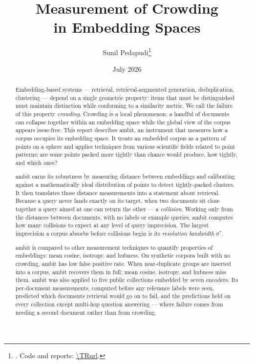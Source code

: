\documentclass[11pt,letterpaper]{article}
\title{\textbf{Measurement of Crowding\\ in Embedding Spaces}}
\author{Sunil Pedapudi\thanks{\TRaffiliation. Code and reports:
\url{\TRurl}.}}
\date{July 2026}
\newcommand{\sstar}{\sigma^{*}}
\begin{document}
\maketitle
\thispagestyle{empty}
\vspace{-3.5em}

\begin{abstract}
Embedding-based systems --- retrieval, retrieval-augmented generation,
deduplication, clustering --- depend on a single geometric property: items
that must be distinguished must maintain distinction while conforming to a
similarity metric. We call the failure of this property \emph{crowding}.
Crowding is a local phenomenon: a handful of documents can collapse
together within an embedding space while the global view of the corpus
appears issue-free. This report describes \textsf{ambit}, an instrument
that measures how a corpus occupies its embedding space. It treats an
embedded corpus as a pattern of points on a sphere and applies techniques
from various scientific fields related to point patterns: are some points
packed more tightly than chance would produce, how tightly, and which
ones?

\textsf{ambit} earns its robustness by measuring distance between
embeddings and calibrating against a mathematically ideal distribution of
points to detect tightly-packed clusters. It then translates those
distance measurements into a statement about retrieval. Because a query
never lands exactly on its target, when two documents sit close together a
query aimed at one can return the other --- a \emph{collision}. Working only from the distances between documents, with no labels or
example queries, \textsf{ambit} computes how many collisions to expect
at any level of query imprecision. The largest imprecision a
corpus absorbs before collisions begin is its \emph{resolution bandwidth}
$\sstar$.

\textsf{ambit} is compared to other measurement techniques to quantify
properties of embeddings: mean cosine, isotropy, and hubness. On synthetic
corpora built with no crowding, \textsf{ambit} has low false positive
rate. When near-duplicate groups are inserted into a corpus,
\textsf{ambit} recovers them in full; mean cosine, isotropy, and hubness
miss them. \textsf{ambit} was also applied to five public collections embedded by
seven encoders. Its per-document measurements, computed before any
relevance labels were seen, predicted which documents retrieval would go
on to fail, and the predictions held on every collection except
multi-hop question answering --- where failure comes from needing a
second document rather than from crowding.


\end{abstract}
\end{document}
